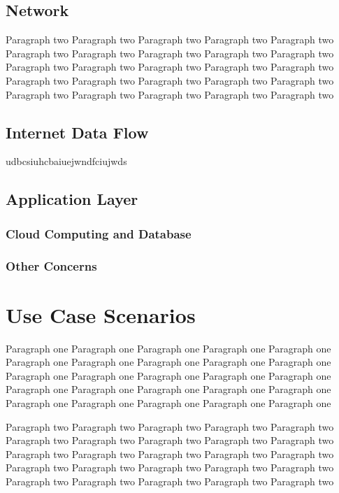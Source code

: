 \documentclass[10pt,journal,final,a4paper,nofonttune]{IEEEtran}
\begin{document}
\subsection{Network}

Paragraph two Paragraph two Paragraph two Paragraph two Paragraph two 
Paragraph two Paragraph two Paragraph two Paragraph two Paragraph two 
Paragraph two Paragraph two Paragraph two Paragraph two Paragraph two 
Paragraph two Paragraph two Paragraph two Paragraph two Paragraph two 
Paragraph two Paragraph two Paragraph two Paragraph two Paragraph two 

\subsection{Internet Data Flow}


udbcsiuhcbaiuejwndfciujwds


\subsection{Application Layer}


\subsubsection{Cloud Computing and Database}

\subsubsection{Other Concerns}


\section{Use Case Scenarios}
Paragraph one Paragraph one Paragraph one Paragraph one Paragraph one 
Paragraph one Paragraph one Paragraph one Paragraph one Paragraph one 
Paragraph one Paragraph one Paragraph one Paragraph one Paragraph one 
Paragraph one Paragraph one Paragraph one Paragraph one Paragraph one 
Paragraph one Paragraph one Paragraph one Paragraph one Paragraph one 

Paragraph two Paragraph two Paragraph two Paragraph two Paragraph two 
Paragraph two Paragraph two Paragraph two Paragraph two Paragraph two 
Paragraph two Paragraph two Paragraph two Paragraph two Paragraph two 
Paragraph two Paragraph two Paragraph two Paragraph two Paragraph two 
Paragraph two Paragraph two Paragraph two Paragraph two Paragraph two 
\end{document}
